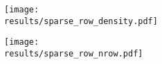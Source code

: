 \documentclass{article}
\begin{document}
\newcommand{\results}{../../simulations/timings/pics}

\begin{figure}[btp]
    \begin{subfigure}[b]{0.49\textwidth}
        \texttt{[image: \\results/sparse\_row\_density.pdf]}
        \caption{}
    \end{subfigure}
    \begin{subfigure}[b]{0.49\textwidth}
        \texttt{[image: \\results/sparse\_row\_nrow.pdf]}
        \caption{}
    \end{subfigure}
\end{figure}
\end{document}
